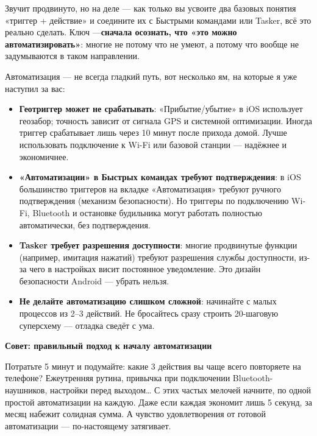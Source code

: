 Звучит продвинуто, но на деле — как только вы усвоите два базовых понятия «триггер + действие» и соедините их с Быстрыми командами или Tasker, всё это реально сделать. Ключ —\textbf{сначала осознать, что «это можно автоматизировать»}: многие не потому что не умеют, а потому что вообще не задумываются в таком направлении.


Автоматизация — не всегда гладкий путь, вот несколько ям, на которые я уже наступил за вас:

\begin{itemize}
  \item \textbf{Геотриггер может не срабатывать}: «Прибытие/убытие» в iOS использует геозабор; точность зависит от сигнала GPS и системной оптимизации. Иногда триггер срабатывает лишь через 10 минут после прихода домой. Лучше использовать подключение к Wi-Fi или базовой станции — надёжнее и экономичнее.
  \item \textbf{«Автоматизации» в Быстрых командах требуют подтверждения}: в iOS большинство триггеров на вкладке «Автоматизация» требуют ручного подтверждения (механизм безопасности). Но триггеры по подключению Wi-Fi, Bluetooth и остановке будильника могут работать полностью автоматически, без подтверждения.
  \item \textbf{Tasker требует разрешения доступности}: многие продвинутые функции (например, имитация нажатий) требуют разрешения службы доступности, из-за чего в настройках висит постоянное уведомление. Это дизайн безопасности Android — убрать нельзя.
  \item \textbf{Не делайте автоматизацию слишком сложной}: начинайте с малых процессов из 2–3 действий. Не бросайтесь сразу строить 20-шаговую суперсхему — отладка сведёт с ума.
\end{itemize}

\textbf{Совет: правильный подход к началу автоматизации}\par

Потратьте 5 минут и подумайте: какие 3 действия вы чаще всего повторяете на телефоне? Ежеутренняя рутина, привычка при подключении Bluetooth-наушников, настройки перед выходом… С этих частых мелочей начните, по одной простой автоматизации на каждую. Даже если каждая экономит лишь 5 секунд, за месяц набежит солидная сумма. А чувство удовлетворения от готовой автоматизации — по-настоящему затягивает.

